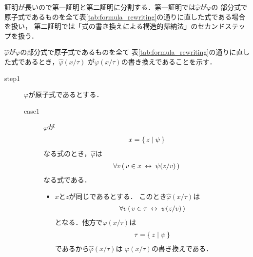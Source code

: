 	
	証明が長いので第一証明と第二証明に分割する．第一証明では$\widehat{\varphi}$が$\varphi$の
	部分式で原子式であるものを全て表\ref{tab:formula_rewriting}の通りに直した式である場合を扱い，
	第二証明では「式の書き換えによる構造的帰納法」のセカンドステップを扱う．
	
	\begin{metaprf}[第一] $\widehat{\varphi}$が$\varphi$の部分式で原子式であるものを全て
		表\ref{tab:formula_rewriting}の通りに直した式であるとき，$\widehat{\varphi}(x/\tau)$
		が$\varphi(x/\tau)$の書き換えであることを示す．
		\begin{description}
			\item[step1] $\varphi$が原子式であるとする．
				\begin{description}
					\item[case1] $\varphi$が
						\begin{align}
							x = \{\, z \mid \psi\, \}
						\end{align}
						なる式のとき，$\widehat{\varphi}$は
						\begin{align}
							\forall v\, (\, v \in x \hspace{0.25em}\leftrightarrow\hspace{0.25em} \psi(z/v)\, )
						\end{align}
						なる式である．
						\begin{itemize}
							\item $x$と$z$が同じであるとする．
								このとき$\widehat{\varphi}(x/\tau)$は
								\begin{align}
									\forall v\, (\, v \in \tau \hspace{0.25em}\leftrightarrow\hspace{0.25em} \psi(z/v)\, )
								\end{align}
								となる．他方で$\varphi(x/\tau)$は
								\begin{align}
									\tau = \{\, z \mid \psi\, \}
								\end{align}
								であるから$\widehat{\varphi}(x/\tau)$は
								$\varphi(x/\tau)$の書き換えである．
								

\end{itemize}
\end{description}
\end{description}
\end{metaprf}
